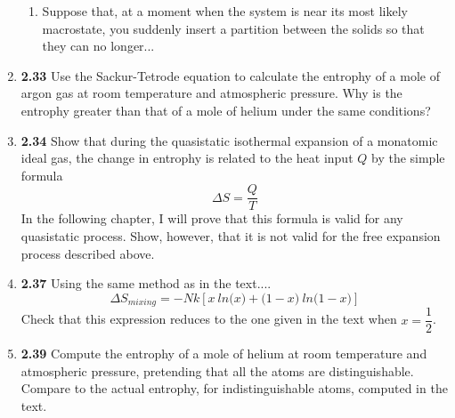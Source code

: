 \documentclass[fleqn]{article}
\begin{document}
\begin{enumerate}
\begin{enumerate}
      \item Suppose that, at a moment when the system is near its most likely macrostate, you suddenly insert a partition between 
      the solids so that they can no longer...


    \end{enumerate}


    \item \textbf{2.33} Use the Sackur-Tetrode equation to calculate the entrophy of a mole of argon gas at room 
    temperature and atmospheric pressure. Why is the entrophy greater than that of a mole of helium under the same conditions?


    \item \textbf{2.34} Show that during the quasistatic isothermal expansion of a monatomic ideal gas, the change in entrophy is
    related to the heat input $Q$ by the simple formula
    $$
      \Delta S=\dfrac{Q}{T}
    $$
    In the following chapter, I will prove that this formula is valid for any quasistatic process. Show, however, that it is not valid
    for the free expansion process described above.


    \item \textbf{2.37} Using the same method as in the text....
    $$  
      \Delta S_{mixing}=-Nk \left[x ~ ln\bigg( x \bigg)+\bigg( 1-x \bigg) ~ ln\bigg( 1-x \bigg)\right]
    $$
    Check that this expression reduces to the one given in the text when $x=\dfrac{1}{2}$.


    \item \textbf{2.39} Compute the entrophy of a mole of helium at room temperature and atmospheric pressure, pretending that all 
    the atoms are distinguishable. Compare to the actual entrophy, for indistinguishable atoms, computed in the text.


  \end{enumerate}
\end{document}
